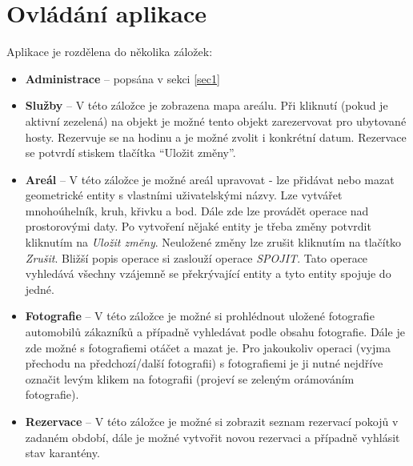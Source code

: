 \documentclass[11pt,a4paper]{article}
\newcommand\mycomment[1]{}
\begin{document}
\section{Ovládání aplikace}
Aplikace je rozdělena do několika záložek: 
\begin{itemize}
\item \textbf{Administrace} -- popsána v sekci \ref{sec1}
\item \textbf{Služby} -- V této záložce je zobrazena mapa areálu. Při kliknutí (pokud je aktivní zezelená) na objekt je možné tento objekt zarezervovat pro ubytované hosty. Rezervuje se na hodinu a je možné zvolit i konkrétní datum. Rezervace se potvrdí stiskem tlačítka ``Uložit změny''.

\item \textbf{Areál} -- V této záložce je možné areál upravovat - lze přidávat nebo mazat geometrické entity s vlastními uživatelskými názvy. Lze vytvářet mnohoúhelník, kruh, křivku a bod. Dále zde lze provádět operace nad prostorovými daty. Po vytvoření nějaké entity je třeba změny potvrdit kliknutím na {\em Uložit změny}. Neuložené změny lze zrušit kliknutím na tlačítko {\em Zrušit}. Bližší popis operace si zaslouží operace {\em SPOJIT}. Tato operace vyhledává všechny vzájemně se překrývající entity a tyto entity spojuje do jedné. 


\item \textbf{Fotografie} -- V této záložce je možné si prohlédnout uložené fotografie automobilů zákazníků a případně vyhledávat podle obsahu fotografie. Dále je zde možné s fotografiemi otáčet a mazat je. Pro jakoukoliv operaci (vyjma přechodu na předchozí/další fotografii) s fotografiemi je ji nutné nejdříve označit levým klikem na fotografii (projeví se zeleným orámováním fotografie).
\item \textbf{Rezervace} -- V této záložce je možné si zobrazit seznam rezervací pokojů v zadaném období, dále je možné vytvořit novou rezervaci a případně vyhlásit stav karantény.
\end{itemize}
\mycomment{\begin{figure}[h!]
\begin{center}
\scalebox{0.5}{\texttt{[image: images/sluzby.png]}}
\caption{Obrazovka služeb.}
\label{sluzby}
\end{center}
\end{figure}}
\mycomment{\begin{figure}[h!]
\begin{center}
\scalebox{0.6}{\texttt{[image: images/fotografie.png]}}
\caption{Obrazovka fotografií.}
\label{foto}
\end{center}
\end{figure}}
\end{document}
